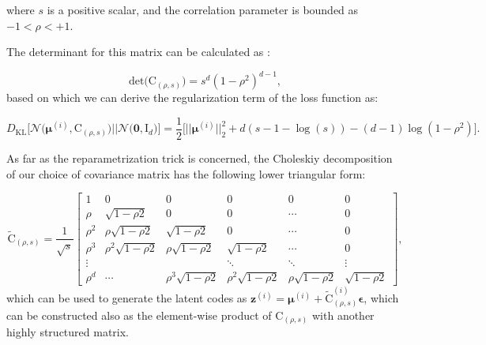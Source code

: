 \documentclass{article}
\begin{document}
where $s$ is a positive scalar, and the correlation parameter is bounded as $-1 < \rho  < +1$.

The determinant for this matrix can be calculated as \cite{10.2307/1993228}: 

\begin{equation} \label{eq:rho_det}
\text{det} \big( \mathrm{C}_{(\rho,s)} \big) = s^d (1 - \rho^2)^{d-1},
\end{equation}
based on which we can derive the regularization term of the loss function as:

\begin{equation} \label{eq:rho_KLD_loss}
D_{\text{KL}}\Big[ \mathcal{N} \Big( \boldsymbol{\mu}^{(i)}, \mathrm{C}_{(\rho,s)} \Big)    \Big|\Big|  \mathcal{N} \big( \mathbf{0}, \mathrm{I}_d \big)  \Big] = \frac{1}{2} \Big[
\big|\big| \boldsymbol{\mu}^{(i)} \big|\big|_2^2 + d(s-1-\log{(s)})  - (d-1)\log{(1 - \rho^2)}  
\Big].
\end{equation}


As far as the reparametrization trick is concerned, the Choleskiy decomposition of our choice of covariance matrix has the following lower triangular form:

\begin{equation}    \label{eq:rho_chol}
\tilde{\mathrm{C}}_{(\rho,s)} = \frac{1}{\sqrt{s}} \begin{bmatrix}
    1          & 0        & 0     & 0       & 0   & 0 \\
    \rho       & \sqrt{1-\rho 2}           & 0       & 0       & \cdots   & 0 \\
    \rho^2     & \rho\sqrt{1-\rho 2}        & \sqrt{1-\rho 2}          & 0         & \cdots   & 0 \\
    \rho^3     & \rho^2\sqrt{1-\rho 2}      & \rho\sqrt{1-\rho 2}       & \sqrt{1-\rho 2}           & \cdots   & 0 \\
    \vdots     &       &       & \ddots       & \ddots   & \vdots      \\
    \rho^{d} & \cdots  & \rho^3 \sqrt{1-\rho 2} & \rho^2 \sqrt{1-\rho 2}   & \rho \sqrt{1-\rho 2}   & \sqrt{1-\rho 2}
  \end{bmatrix},
\end{equation}
which can be used to generate the latent codes as $\mathbf{z}^{(i)} = \boldsymbol{\mu}^{(i)} + \tilde{\mathrm{C}}_{(\rho,s)}^{(i)} \boldsymbol{\epsilon}$, which can be constructed also as the element-wise product of $\mathrm{C}_{(\rho,s)}$ with another highly structured matrix.
\end{document}
